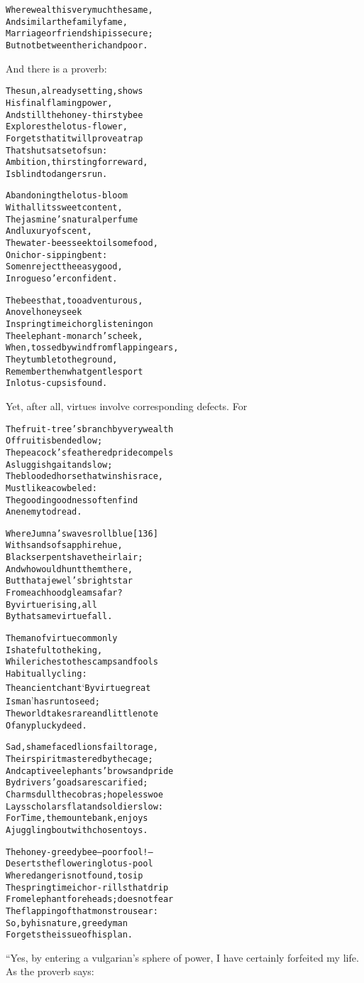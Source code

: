 \documentclass{article}
\renewenvironment{verbatim}{\begin{alltt}\normalfont\begin{centering}}{\end{centering}\end{alltt}}
\begin{document}
\begin{verbatim}
Where wealth is very much the same,
And similar the family fame,
Marriage or friendship is secure;
But not between the rich and poor.
\end{verbatim}
And there is a proverb:

\begin{verbatim}
The sun, already setting, shows
    His final flaming power,
And still the honey-thirsty bee
    Explores the lotus-flower,
Forgets that it will prove a trap
    That shuts at set of sun:
Ambition, thirsting for reward,
    Is blind to dangers run.

Abandoning the lotus-bloom
    With all its sweet content,
The jasmine's natural perfume
    And luxury of scent,
The water-bees seek toilsome food,
    On ichor-sipping bent:
So men reject the easy good,
    In rogues o'erconfident.

The bees that, too adventurous,
    A novel honey seek
In springtime ichor glistening on
    The elephant-monarch's cheek,
When, tossed by wind from flapping ears,
    They tumble to the ground,
Remember then what gentle sport
    In lotus-cups is found.
\end{verbatim}
Yet, after all, virtues involve corresponding defects. For

\begin{verbatim}
The fruit-tree's branch by very wealth
    Of fruit is bended low;
The peacock's feathered pride compels
    A sluggish gait and slow;
The blooded horse that wins his race,
    Must like a cow be led:
The good in goodness often find
    An enemy to dread.

Where Jumna's waves roll blue                           [136]
With sands of sapphire hue,
Black serpents have their lair;
And who would hunt them there,
But that a jewel's bright star
From each hood gleams afar?
By virtue rising, all
By that same virtue fall.

The man of virtue commonly
    Is hateful to the king,
While riches to the scamps and fools
    Habitually cling:
The ancient chant ‘By virtue great
    Is man’ has run to seed;
The world takes rare and little note
    Of any plucky deed.

Sad, shamefaced lions fail to rage,
Their spirit mastered by the cage;
And captive elephants' brows and pride
By drivers' goads are scarified;
Charms dull the cobras; hopeless woe
Lays scholars flat and soldiers low:
For Time, the mountebank, enjoys
A juggling bout with chosen toys.

The honey-greedy bee--poor fool!--
Deserts the flowering lotus-pool
Where danger is not found, to sip
The springtime ichor-rills that drip
From elephant foreheads; does not fear
The flapping of that monstrous ear:
So, by his nature, greedy man
Forgets the issue of his plan.
\end{verbatim}
“Yes, by entering a vulgarian's sphere of power, I have certainly
forfeited my life. As the proverb says:
\end{document}
